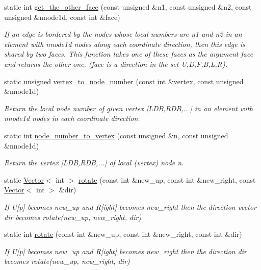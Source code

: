 \begin{DoxyCompactItemize}
static int \hyperlink{classoomph_1_1OcTree_ab03edae455d5bd788acf426ca3f87b9d}{get\+\_\+the\+\_\+other\+\_\+face} (const unsigned \&n1, const unsigned \&n2, const unsigned \&nnode1d, const int \&face)
\begin{DoxyCompactList}\small\item\em If an edge is bordered by the nodes whose local numbers are n1 and n2 in an element with nnode1d nodes along each coordinate direction, then this edge is shared by two faces. This function takes one of these faces as the argument {\ttfamily face} and returns the other one. ({\ttfamily face} is a direction in the set U,D,F,B,L,R). \end{DoxyCompactList}\item 
static unsigned \hyperlink{classoomph_1_1OcTree_af2a129b95ad303ed340bb8bd86e05384}{vertex\+\_\+to\+\_\+node\+\_\+number} (const int \&vertex, const unsigned \&nnode1d)
\begin{DoxyCompactList}\small\item\em Return the local node number of given vertex \mbox{[}L\+DB,R\+DB,...\mbox{]} in an element with nnode1d nodes in each coordinate direction. \end{DoxyCompactList}\item 
static int \hyperlink{classoomph_1_1OcTree_a43cbe5258a41168fe2d891e52ae64e6b}{node\+\_\+number\+\_\+to\+\_\+vertex} (const unsigned \&n, const unsigned \&nnode1d)
\begin{DoxyCompactList}\small\item\em Return the vertex \mbox{[}L\+DB,R\+DB,...\mbox{]} of local (vertex) node n. \end{DoxyCompactList}\item 
static \hyperlink{classoomph_1_1Vector}{Vector}$<$ int $>$ \hyperlink{classoomph_1_1OcTree_a25e5185f0395a19883e216fd80103cf7}{rotate} (const int \&new\+\_\+up, const int \&new\+\_\+right, const \hyperlink{classoomph_1_1Vector}{Vector}$<$ int $>$ \&dir)
\begin{DoxyCompactList}\small\item\em If U\mbox{[}p\mbox{]} becomes new\+\_\+up and R\mbox{[}ight\mbox{]} becomes new\+\_\+right then the direction vector {\ttfamily dir} becomes rotate(new\+\_\+up, new\+\_\+right, dir) \end{DoxyCompactList}\item 
static int \hyperlink{classoomph_1_1OcTree_ab65a00f8f47eb8b6da56ffa9d6ba8f36}{rotate} (const int \&new\+\_\+up, const int \&new\+\_\+right, const int \&dir)
\begin{DoxyCompactList}\small\item\em If U\mbox{[}p\mbox{]} becomes new\+\_\+up and R\mbox{[}ight\mbox{]} becomes new\+\_\+right then the direction {\ttfamily dir} becomes {\ttfamily rotate(new\+\_\+up, new\+\_\+right, dir)} \end{DoxyCompactList}\end{DoxyCompactItemize}
